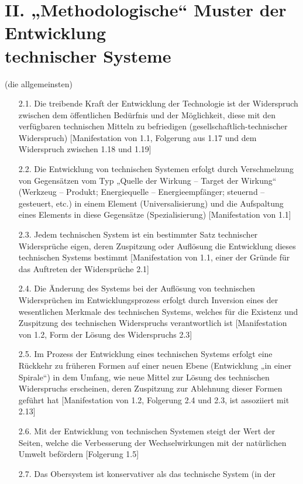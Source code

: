 \documentclass[11pt,a4paper]{article}
\begin{document}
\section*{II. „Methodologische“ Muster der Entwicklung\\ technischer Systeme}
(die allgemeinsten)
\begin{itemize}\itemsep0pt
\item[2.1.] Die treibende Kraft der Entwicklung der Technologie ist der
  Widerspruch zwischen dem öffentlichen Bedürfnis und der Möglichkeit, diese
  mit den verfügbaren technischen Mitteln zu befriedigen
  (gesellschaftlich-technischer Widerspruch) [Manifestation von 1.1, Folgerung
    aus 1.17 und dem Widerspruch zwischen 1.18 und 1.19]
\item[2.2.] Die Entwicklung von technischen Systemen erfolgt durch
  Verschmelzung von Gegen\-sätzen vom Typ „Quelle der Wirkung -- Target der
  Wirkung“ (Werkzeug -- Produkt; Energiequelle -- Energieempfänger; steuernd
  -- gesteuert, etc.) in einem Element (Universalisierung) und die Aufspaltung
  eines Elements in diese Gegensätze (Spezialisierung) [Manifestation von 1.1]
\item[2.3.] Jedem technischen System ist ein bestimmter Satz technischer
  Widersprüche eigen, deren Zuspitzung oder Auf\-lösung die Entwicklung dieses
  technischen Systems bestimmt [Manifestation von 1.1, einer der Gründe für
    das Auftreten der Widersprüche 2.1]
\item[2.4.] Die Änderung des Systems bei der Auf\-lösung von technischen
  Widersprüchen im Entwicklungsprozess erfolgt durch Inversion eines der
  wesentlichen Merkmale des technischen Systems, welches für die Existenz und
  Zuspitzung des technischen Widerspruchs verantwortlich ist [Manifestation
    von 1.2, Form der Lösung des Widerspruchs 2.3]
\item[2.5.] Im Prozess der Entwicklung eines technischen Systems erfolgt eine
  Rückkehr zu früheren Formen auf einer neuen Ebene (Entwicklung „in einer
  Spirale“) in dem Umfang, wie neue Mittel zur Lösung des technischen
  Widerspruchs erscheinen, deren Zuspitzung zur Ablehnung dieser Formen
  geführt hat [Manifestation von 1.2, Folgerung 2.4 und 2.3, ist assoziiert
    mit 2.13]
\item[2.6.] Mit der Entwicklung von technischen Systemen steigt der Wert der
  Seiten, welche die Verbesserung der Wechselwirkungen mit der natürlichen
  Umwelt befördern [Folgerung 1.5]
\item[2.7.] Das Obersystem ist konservativer als das technische System (in der

\end{itemize}
\end{document}
